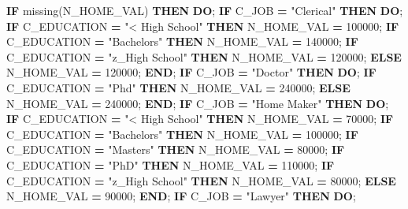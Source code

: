 \documentclass[]{article}
\newenvironment{Shaded}{\begin{snugshade}}{\end{snugshade}}
\newcommand{\KeywordTok}[1]{\textcolor[rgb]{0.13,0.29,0.53}{\textbf{{#1}}}}
\newcommand{\DecValTok}[1]{\textcolor[rgb]{0.00,0.00,0.81}{{#1}}}
\newcommand{\StringTok}[1]{\textcolor[rgb]{0.31,0.60,0.02}{{#1}}}
\newcommand{\NormalTok}[1]{{#1}}
\begin{document}
\begin{Shaded}
\begin{Highlighting}[]
    \KeywordTok{IF} \NormalTok{missing(N_HOME_VAL) }\KeywordTok{THEN} \KeywordTok{DO}\NormalTok{;}
        \KeywordTok{IF} \NormalTok{C_JOB }\KeywordTok{=} \StringTok{"Clerical"} \KeywordTok{THEN} \KeywordTok{DO}\NormalTok{;}
            \KeywordTok{IF} \NormalTok{C_EDUCATION }\KeywordTok{=} \StringTok{"< High School"} \KeywordTok{THEN} \NormalTok{N_HOME_VAL }\KeywordTok{=} \DecValTok{100000}\NormalTok{;}
            \KeywordTok{IF} \NormalTok{C_EDUCATION }\KeywordTok{=} \StringTok{"Bachelors"} \KeywordTok{THEN} \NormalTok{N_HOME_VAL }\KeywordTok{=} \DecValTok{140000}\NormalTok{;}
            \KeywordTok{IF} \NormalTok{C_EDUCATION }\KeywordTok{=} \StringTok{"z_High School"} \KeywordTok{THEN} \NormalTok{N_HOME_VAL }\KeywordTok{=} \DecValTok{120000}\NormalTok{;}
            \KeywordTok{ELSE} \NormalTok{N_HOME_VAL }\KeywordTok{=} \DecValTok{120000}\NormalTok{;}
        \KeywordTok{END}\NormalTok{;}
        \KeywordTok{IF} \NormalTok{C_JOB }\KeywordTok{=} \StringTok{"Doctor"} \KeywordTok{THEN} \KeywordTok{DO}\NormalTok{;}
            \KeywordTok{IF} \NormalTok{C_EDUCATION }\KeywordTok{=} \StringTok{"Phd"} \KeywordTok{THEN} \NormalTok{N_HOME_VAL }\KeywordTok{=} \DecValTok{240000}\NormalTok{;}
            \KeywordTok{ELSE} \NormalTok{N_HOME_VAL }\KeywordTok{=} \DecValTok{240000}\NormalTok{;}
        \KeywordTok{END}\NormalTok{;}
        \KeywordTok{IF} \NormalTok{C_JOB }\KeywordTok{=} \StringTok{"Home Maker"} \KeywordTok{THEN} \KeywordTok{DO}\NormalTok{;}
            \KeywordTok{IF} \NormalTok{C_EDUCATION }\KeywordTok{=} \StringTok{"< High School"} \KeywordTok{THEN} \NormalTok{N_HOME_VAL }\KeywordTok{=} \DecValTok{70000}\NormalTok{;}
            \KeywordTok{IF} \NormalTok{C_EDUCATION }\KeywordTok{=} \StringTok{"Bachelors"} \KeywordTok{THEN} \NormalTok{N_HOME_VAL }\KeywordTok{=} \DecValTok{100000}\NormalTok{;}
            \KeywordTok{IF} \NormalTok{C_EDUCATION }\KeywordTok{=} \StringTok{"Masters"} \KeywordTok{THEN} \NormalTok{N_HOME_VAL }\KeywordTok{=} \DecValTok{80000}\NormalTok{;}
            \KeywordTok{IF} \NormalTok{C_EDUCATION }\KeywordTok{=} \StringTok{"PhD"} \KeywordTok{THEN} \NormalTok{N_HOME_VAL }\KeywordTok{=} \DecValTok{110000}\NormalTok{;}
            \KeywordTok{IF} \NormalTok{C_EDUCATION }\KeywordTok{=} \StringTok{"z_High School"} \KeywordTok{THEN} \NormalTok{N_HOME_VAL }\KeywordTok{=} \DecValTok{80000}\NormalTok{;}
            \KeywordTok{ELSE} \NormalTok{N_HOME_VAL }\KeywordTok{=} \DecValTok{90000}\NormalTok{;}
        \KeywordTok{END}\NormalTok{;}
        \KeywordTok{IF} \NormalTok{C_JOB }\KeywordTok{=} \StringTok{"Lawyer"} \KeywordTok{THEN} \KeywordTok{DO}\NormalTok{;}

\end{Highlighting}
\end{Shaded}
\end{document}

